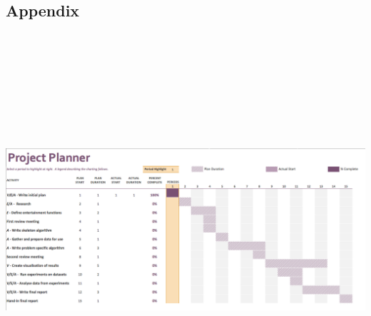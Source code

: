 \documentclass[12pt]{report}
\begin{document}
\clearpage
{}
\begin{landscape} 
\section*{Appendix}
\includegraphics[height=14.5cm, width=\linewidth]{InitialPlanGanttChart.png}
\end{landscape}
\end{document}
